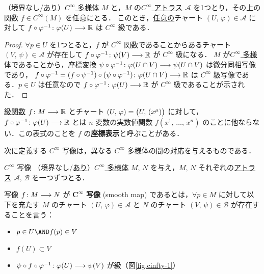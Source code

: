 \documentclass[geometry_main]{subfiles}
\begin{document}
\begin{mylem}[label=lem:cinfty]{}
	（境界なし/\hyperref[def:mani-with-boundary]{あり}）\hyperref[diffmani]{$C^\infty$ 多様体} $M$ と，$M$ の\hyperref[diffmani]{$C^\infty$ アトラス} $\mathcal{A}$ を1つとり，その上の\cinfty 関数 $f \in C^\infty (M)$ を任意にとる．
	このとき，\underline{任意の}チャート $(U,\, \varphi) \in \mathcal{A}$ に対して $f \circ \varphi^{-1}\colon \varphi(U) \longrightarrow \mathbb{R}$ は $C^\infty$ 級である．
\end{mylem}

\begin{proof}
	$\forall p \in U$ を1つとると，$f$ が $C^\infty$  関数であることからあるチャート $(V,\, \psi) \in \mathcal{A}$ が存在して $f \circ \varphi^{-1} \colon \psi(V) \longrightarrow \mathbb{R}$ が $C^\infty$ 級になる．
	$M$ が\hyperref[diffmani]{$C^\infty$ 多様体}であることから，座標変換 $\psi \circ \varphi^{-1} \colon \varphi(U\cap V) \longrightarrow \psi(U\cap V)$ は\hyperref[def.diffeomo]{微分同相写像}であり，
	$f \circ \varphi^{-1} = (f \circ \psi^{-1}) \circ (\psi \circ \varphi^{-1}) \colon \varphi(U\cap V) \longrightarrow \mathbb{R}$ は $C^\infty$ 級写像である．$p \in U$ は任意なので $f \circ \varphi^{-1} \colon \varphi(U) \longrightarrow \mathbb{R}$ が $C^\infty$  級であることが示された．
\end{proof}

\hyperref[def.cinfty]{\cinfty 級関数} $f \colon M \longrightarrow \mathbb{R}$ とチャート $(U,\, \varphi) = \bigl(U,\, (x^\mu)\bigr)$ に対して， $f \circ \varphi^{-1} \colon \varphi(U) \longrightarrow \mathbb{R}$ とは $n$ 変数の実数値関数
$f(x^1,\, \dots,\, x^n)$ のことに他ならない．この表式のことを $f$ の\textbf{座標表示}と呼ぶことがある．

次に定義する $C^\infty$ 写像は，異なる $C^\infty$ 多様体の間の対応を与えるものである．

\begin{mydef}[label=def.cinfty_mapping]{$C^\infty$ 写像}
	（境界なし/\hyperref[def:mani-with-boundary]{あり}）\hyperref[diffmani]{$C^\infty$ 多様体} $M,\, N$ を与え，$M,\, N$ それぞれの\hyperref[diffmani]{\cinfty アトラス} $\mathcal{A},\, \mathcal{B}$ を一つずつとる．
	
	写像 $f \colon M \longrightarrow N$ が $\bm{C^\infty}$ \textbf{写像} (smooth map) であるとは，$\forall p \in M$ に対して以下を充たす $M$ のチャート $(U,\, \varphi) \in \mathcal{A}$ と $N$ のチャート $(V,\, \psi) \in \mathcal{B}$ が存在することを言う：
	\begin{itemize}
		\item $p \in U \AND f(p) \in V$
		\item $f(U) \subset V$
		\item $\psi \circ f  \circ \varphi^{-1} \colon \varphi(U) \longrightarrow \psi(V)$ が\cinfty 級（図\ref{fig.cinfty-1}）
	\end{itemize}
\end{mydef}
\end{document}

